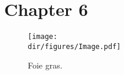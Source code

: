 
\chapter{Chapter 6}
\label{ch:chapter-6}

\lipsum[1-6]

\begin{figure}[t]
	\centering
	\texttt{[image: \\dir/figures/Image.pdf]}
	\caption{Foie gras.}
	\label{fig:Duck6}
\end{figure}